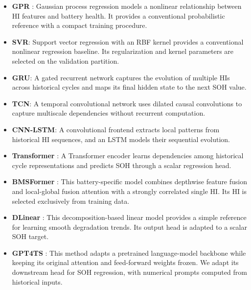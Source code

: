 \documentclass[preprint,12pt]{elsarticle}
\begin{document}
\begin{itemize}
\item \textbf{GPR} \cite{richardson2017gaussian}: Gaussian process regression models a nonlinear relationship between HI features and battery health. It provides a conventional probabilistic reference with a compact training procedure.
\item \textbf{SVR}: Support vector regression with an RBF kernel provides a conventional nonlinear regression baseline. Its regularization and kernel parameters are selected on the validation partition.
\item \textbf{GRU}: A gated recurrent network captures the evolution of multiple HIs across historical cycles and maps its final hidden state to the next SOH value.
\item \textbf{TCN}: A temporal convolutional network uses dilated causal convolutions to capture multiscale dependencies without recurrent computation.
\item \textbf{CNN-LSTM}: A convolutional frontend extracts local patterns from historical HI sequences, and an LSTM models their sequential evolution.
\item \textbf{Transformer} \cite{vaswani2017attention}: A Transformer encoder learns dependencies among historical cycle representations and predicts SOH through a scalar regression head.
\item \textbf{BMSFormer} \cite{li2024bmsformer}: This battery-specific model combines depthwise feature fusion and local-global fusion attention with a strongly correlated single HI. Its HI is selected exclusively from training data.
\item \textbf{DLinear} \cite{zeng2023transformers}: This decomposition-based linear model provides a simple reference for learning smooth degradation trends. Its output head is adapted to a scalar SOH target.
\item \textbf{GPT4TS} \cite{zhou2023one}: This method adapts a pretrained language-model backbone while keeping its original attention and feed-forward weights frozen. We adapt its downstream head for SOH regression, with numerical prompts computed from historical inputs.
\end{itemize}
\end{document}
